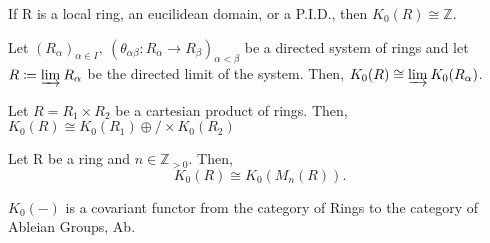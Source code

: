 \documentclass[../category_theory.tex]{subfiles}
\begin{document}
\begin{example}
	If R is a local ring, an eucilidean domain, or a P.I.D., then \(K_{0}(R)\cong \mathbb{Z}.\)
\end{example}
\begin{prop*}
	Let \((R_{\alpha })_{\alpha \in I}, \: (\theta_{\alpha \beta }:R_{\alpha }\rightarrow R_{\beta })_{\alpha <\beta }\) be a directed system of rings and let \(R\coloneqq \varinjlim_{}R_{\alpha }\) be the directed limit of the system. Then, \(K_{0}(R)\cong \varinjlim_{}K_{0}(R_{\alpha })\).
\end{prop*}
\begin{prop*}
	Let \(R = R_1\times R_2\) be a cartesian product of rings. Then, \(K_{0}(R)\cong K_{0}(R_1)\oplus / \times K_{0}(R_2)\)
\end{prop*}
\begin{theorem*}
	Let R be a ring and \(n\in \mathbb{Z}_{>0}\). Then,
	\[
		K_{0}(R) \cong K_{0}(M_{n}(R)).
	\]
\end{theorem*}
\begin{prop*}
	\(K_{0}(-)\) is a covariant functor from the category of Rings to the category of Ableian Groups, Ab.
\end{prop*}
\end{document}
